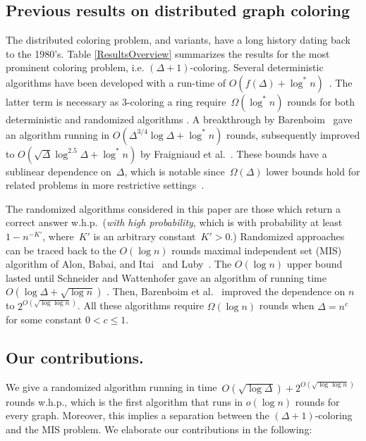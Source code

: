 \documentclass[11pt]{amsart}
\begin{document}
\subsection{Previous results on distributed graph coloring}
The distributed coloring problem, and variants, have a long history dating back to the 1980's. Table \ref{ResultsOverview} summarizes the results for the most prominent coloring problem, i.e. $(\Delta+1)$-coloring. Several deterministic algorithms have been developed with a run-time of  $O(f(\Delta) + \log^{*} n)$~\cite{bar15a, BEK09,Kuhn2006On,linial92,GPS88,GP87}.  The latter term is necessary as 3-coloring a ring require~$\Omega(\log^{*} n)$ rounds for both deterministic and randomized algorithms \cite{linial92, Noar91}.  A breakthrough by Barenboim~\cite{bar15a} gave an algorithm running in $O(\Delta^{3/4} \log \Delta + \log^{*} n)$ rounds, subsequently improved to $O(\sqrt{\Delta}\log^{2.5}\Delta + \log^{*} n)$ by Fraigniaud et al.~\cite{FraigniaudHK15}. These bounds have a sublinear dependence on~$\Delta$, which is notable since~$\Omega(\Delta)$ lower bounds hold for related problems in more restrictive settings~\cite{ goo14, hef16, hir12, Kuhn2006On, SV93}.

The randomized algorithms considered in this paper are those which return a correct answer w.h.p.~({\it with high probability}, which is with probability at least~$1 - n^{-K'}$, where~$K'$ is an arbitrary constant~$K'>0$.) Randomized approaches can be traced back to the $O(\log n)$ rounds maximal independent set (MIS) algorithm of Alon, Babai, and Itai~\cite{alon86} and Luby~\cite{lub86}. The $O(\log n)$ upper bound lasted until Schneider and Wattenhofer gave an algorithm of running time~$O(\log \Delta + \sqrt{\log n})$  \cite{Sch10}. Then, Barenboim et al.~\cite{BEPS16} improved the dependence on $n$ to $2^{O(\sqrt{\log \log n})}$. All these algorithms require $\Omega(\log n)$ rounds when $\Delta = n^{c}$ for some constant $0<c \leq 1$. 

\subsection{Our contributions.} We give a randomized algorithm running in time~$O(\sqrt{\log \Delta}) + 2^{O(\sqrt{\log \log n})}$ rounds w.h.p., which is the first algorithm that runs in $o(\log n)$ rounds for every graph. Moreover, this implies a separation between the $(\Delta+1)$-coloring and the MIS problem. We elaborate our contributions in the following:
\end{document}
